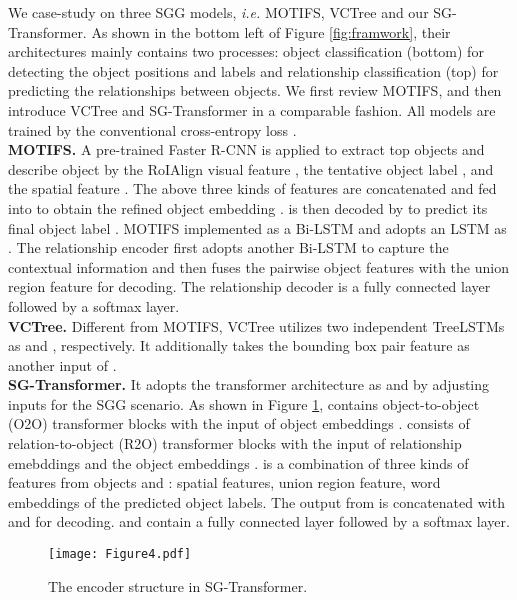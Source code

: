 \documentclass{article}
\begin{document}
We case-study on 
three SGG models, \textit{i.e.} MOTIFS, VCTree and our SG-Transformer. As shown in the bottom left of Figure \ref{fig:framwork}, their architectures  mainly contains two processes: object classification (bottom)  for detecting the object positions and labels and relationship classification (top) for predicting the relationships between objects. We first review  MOTIFS, and then introduce VCTree and SG-Transformer in a comparable fashion. All models are trained by the conventional cross-entropy loss \cite{zellers2018neural}.
\\
\textbf{MOTIFS.} A pre-trained Faster R-CNN \cite{ren2015faster} is applied to extract top  objects  and describe object  by the RoIAlign visual feature ,  the tentative object label , and the spatial feature . The above three kinds of features are concatenated and fed into  to obtain the refined object embedding .  is then decoded by   to predict its final object label . MOTIFS implemented  as a Bi-LSTM and adopts an LSTM as . The relationship encoder  first adopts another Bi-LSTM to capture the contextual information and then fuses the pairwise object features with the union region feature for decoding. The relationship decoder  is a fully connected layer followed by a softmax layer. 
\\
\textbf{VCTree.} Different from MOTIFS, VCTree utilizes two independent TreeLSTMs as  and , respectively. It additionally takes the bounding box pair feature as another input of .
\\
\textbf{SG-Transformer.} It adopts the  transformer architecture as  and   by adjusting inputs for the SGG scenario. As shown in Figure \ref{fig:SGTransformer},  contains  object-to-object (O2O) transformer blocks with the input of object embeddings .  consists of  relation-to-object (R2O) transformer blocks with the input of relationship emebddings   and the object embeddings .  is a combination of  three kinds of features from objects  and : spatial features, union region feature, word embeddings \cite{pennington2014glove} 
of the predicted object labels. The output from  is concatenated with  and  for decoding.  and  contain a fully connected layer followed by a softmax layer. 

\begin{figure}[t]
    \centering
    \texttt{[image: Figure4.pdf]}
    \caption{The encoder structure in SG-Transformer.}
    \label{fig:SGTransformer}
\end{figure}

\iffalse
\end{document}
